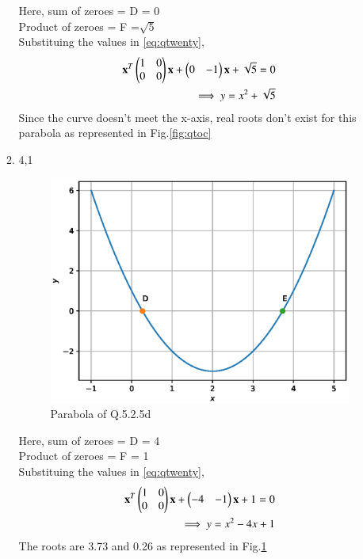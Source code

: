 \begin{enumerate}[label=\thesection.\arabic*.,ref=\thesection.\theenumi]
\begin{enumerate}
		\solution
Here, sum of zeroes = D = 0\\
Product of zeroes = F =$\sqrt{5}$\\
Substituing the values in \ref{eq:qtwenty},\\
\begin{align}
\mathbf{x}^T\begin{pmatrix}1&0\\0&0\end{pmatrix}\mathbf{x}  + \begin{pmatrix}0&-1\end{pmatrix}\mathbf{x} + \sqrt{5} = 0\\
\implies y = x^2 + \sqrt{5}  
\end{align}
Since the curve doesn't meet the x-axis, real roots don't exist for this parabola as represented in Fig.\ref{fig:qtoc}	
		\item 4,1
	\begin{figure}[!ht]
	\centering
	\includegraphics[width=\columnwidth]{./figs/conics/q20d.eps}
	\caption{Parabola of Q.5.2.5d}
	\label{fig:qtod}	
	\end{figure}
	
		\solution 
Here, sum of zeroes = D = 4\\
Product of zeroes = F = 1\\
Substituing the values in \ref{eq:qtwenty},\\
\begin{align}
\mathbf{x}^T\begin{pmatrix}1&0\\0&0\end{pmatrix}\mathbf{x}  + \begin{pmatrix}-4&-1\end{pmatrix}\mathbf{x} + 1 = 0\\
\implies y = x^2 - 4x + 1 
\end{align}
The roots are 3.73 and 0.26 as represented in Fig.\ref{fig:qtod}


\end{enumerate}
\end{enumerate}

